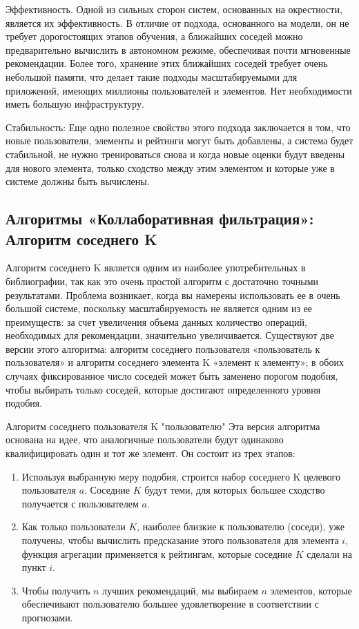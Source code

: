 Эффективность. Одной из сильных сторон систем, основанных на окрестности, является их эффективность. В отличие от подхода, основанного на модели, он не требует дорогостоящих этапов обучения, а ближайших соседей можно предварительно вычислить в автономном режиме, обеспечивая почти мгновенные рекомендации. Более того, хранение этих ближайших соседей требует очень небольшой памяти, что делает такие подходы масштабируемыми для приложений, имеющих миллионы пользователей и элементов. Нет необходимости иметь большую инфраструктуру.

Стабильность: Еще одно полезное свойство этого подхода заключается в том, что новые пользователи, элементы и рейтинги могут быть добавлены, а система будет стабильной, не нужно тренироваться снова и когда новые оценки будут введены для нового элемента, только сходство между этим элементом и которые уже в системе должны быть вычислены.


\subsection{Алгоритмы «Коллаборативная фильтрация»: Алгоритм соседнего K}


Алгоритм соседнего K является одним из наиболее употребительных в библиографии, так как это очень простой алгоритм с достаточно точными результатами. Проблема возникает, когда вы намерены использовать ее в очень большой системе, поскольку масштабируемость не является одним из ее преимуществ: за счет увеличения объема данных количество операций, необходимых для рекомендации, значительно увеличивается. Существуют две версии этого алгоритма: алгоритм соседнего пользователя «пользователь к пользователя» и алгоритм соседнего элемента K «элемент к элементу»; в обоих случаях фиксированное число соседей может быть заменено порогом подобия, чтобы выбирать только соседей, которые достигают определенного уровня подобия.

Алгоритм соседнего пользователя K "пользователю"
Эта версия алгоритма основана на идее, что аналогичные пользователи будут одинаково квалифицировать один и тот же элемент. Он состоит из трех этапов:



\begin{enumerate}
	\item Используя выбранную меру подобия, строится набор соседнего K целевого пользователя $a$. Соседние $K$ будут теми, для которых большее сходство получается с пользователем $a$.
	\item Как только пользователи $K$, наиболее близкие $к$ пользователю (соседи), уже получены, чтобы вычислить предсказание этого пользователя для элемента $i$, функция агрегации применяется $к$ рейтингам, которые соседние $K$ сделали на пункт $i$.
	\item Чтобы получить $n$ лучших рекомендаций, мы выбираем $n$ элементов, которые обеспечивают пользователю большее удовлетворение в соответствии с прогнозами.
\end{enumerate}


